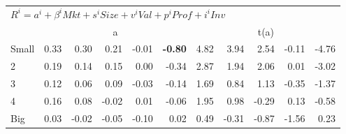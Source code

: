 \begin{tabular}{lrrrrrrrrrr}
  \midrule
  \multicolumn{11}{l}{$R^i=a^i+\beta^iMkt+s^iSize+v^iVal+p^iProf+i^iInv$}  \\
  
     & \multicolumn{5}{c}{a} & \multicolumn{5}{c}{t(a)}   \\
     \cmidrule(r){2-6} \cmidrule(r){7-11} 
    Small  & 0.33  & 0.30  & 0.21  & -0.01  & \textbf{-0.80}  & 4.82  & 3.94  & 2.54  & -0.11  & -4.76   \\
    2  & 0.19  & 0.14  & 0.15  & 0.00  & -0.34  & 2.87  & 1.94  & 2.06  & 0.01  & -3.02   \\
    3  & 0.12  & 0.06  & 0.09  & -0.03  & -0.14  & 1.69  & 0.84  & 1.13  & -0.35  & -1.37   \\
    4  & 0.16  & 0.08  & -0.02  & 0.01  & -0.06  & 1.95  & 0.98  & -0.29  & 0.13  & -0.58   \\
    Big  & 0.03  & -0.02  & -0.05  & -0.10  & 0.02  & 0.49  & -0.31  & -0.87  & -1.56  & 0.23   \\
  
  \bottomrule
\end{tabular}

